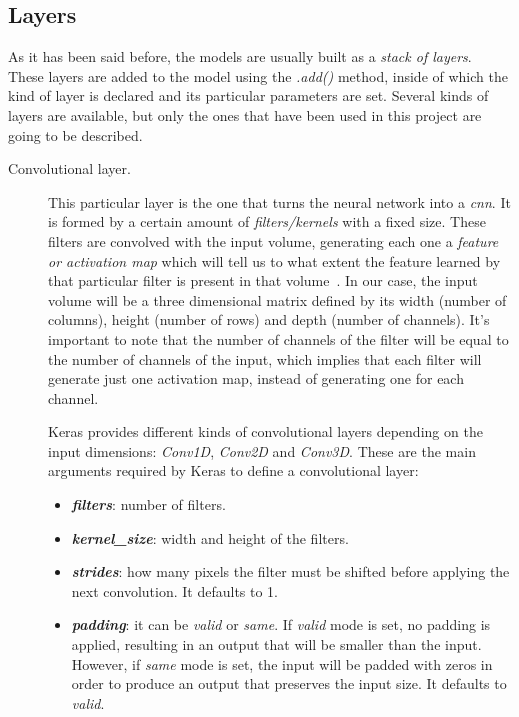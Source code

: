 \subsection{Layers}\label{subsec:layers}
As it has been said before, the models are usually built as a \emph{stack of layers}. These layers are added to the model using the \textit{.add()} method, inside of which the kind of layer is declared and its particular parameters are set. Several kinds of layers are available, but only the ones that have been used in this project are going to be described.
\begin{description}
	\item[Convolutional layer.] This particular layer is the one that turns the neural network into a \emph{\gls{cnn}}. It is formed by a certain amount of \emph{filters/kernels} with a fixed size. These filters are convolved with the input volume, generating each one a \emph{feature or activation map} which will tell us to what extent the feature learned by that particular filter is present in that volume~\cite{cs231n}. In our case, the input volume will be a three dimensional matrix defined by its width (number of columns), height (number of rows) and depth (number of channels). It's important to note that the number of channels of the filter will be equal to the number of channels of the input, which implies that each filter will generate just one activation map, instead of generating one for each channel. 
	
	Keras provides different kinds of convolutional layers depending on the input dimensions: \textit{Conv1D}, \textit{Conv2D} and \textit{Conv3D}. These are the main arguments required by Keras to define a convolutional layer:
	\begin{itemize}
		\item \textbf{\textit{filters}}: number of filters.
		
		\item \textbf{\textit{kernel\_size}}: width and height of the filters.
		
		\item \textbf{\textit{strides}}: how many pixels the filter must be shifted before applying the next convolution. It defaults to 1.
		
		\item \textbf{\textit{padding}}: it can be \textit{valid} or \textit{same}. If \textit{valid} mode is set, no padding is applied, resulting in an output that will be smaller than the input. However, if \textit{same} mode is set, the input will be padded with zeros in order to produce an output that preserves the input size. It defaults to \textit{valid}.
	\end{itemize}


\end{description}
